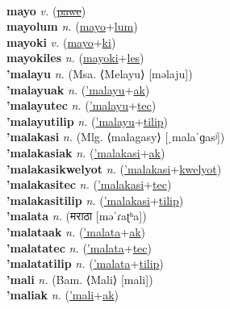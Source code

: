  \label{maipaltolum} \\
\textbf{mayo} \textit{v.} (\hyperref[pawe]{\sout{pawe}})
 \label{mayo} \\
\textbf{mayolum} \textit{n.} (\hyperref[mayo]{mayo}+\hyperref[lum]{lum})
 \label{mayolum} \\
\textbf{mayoki} \textit{v.} (\hyperref[mayo]{mayo}+\hyperref[ki]{ki})
 \label{mayoki} \\
\textbf{mayokiles} \textit{n.} (\hyperref[mayoki]{mayoki}+\hyperref[les]{les})
 \label{mayokiles} \\
\textbf{'malayu} \textit{n.} (Msa. ⟨Melayu⟩ [məlaju])
 \label{'malayu} \\
\textbf{'malayuak} \textit{n.} (\hyperref['malayu]{'malayu}+\hyperref[ak]{ak})
 \label{'malayuak} \\
\textbf{'malayutec} \textit{n.} (\hyperref['malayu]{'malayu}+\hyperref[tec]{tec})
 \label{'malayutec} \\
\textbf{'malayutilip} \textit{n.} (\hyperref['malayu]{'malayu}+\hyperref[tilip]{tilip})
 \label{'malayutilip} \\
\textbf{'malakasi} \textit{n.} (Mlg. ⟨malagasy⟩ [ˌmalaˈɡasʲ])
 \label{'malakasi} \\
\textbf{'malakasiak} \textit{n.} (\hyperref['malakasi]{'malakasi}+\hyperref[ak]{ak})
 \label{'malakasiak} \\
\textbf{'malakasikwelyot} \textit{n.} (\hyperref['malakasi]{'malakasi}+\hyperref[kwelyot]{kwelyot})
 \label{'malakasikwelyot} \\
\textbf{'malakasitec} \textit{n.} (\hyperref['malakasi]{'malakasi}+\hyperref[tec]{tec})
 \label{'malakasitec} \\
\textbf{'malakasitilip} \textit{n.} (\hyperref['malakasi]{'malakasi}+\hyperref[tilip]{tilip})
 \label{'malakasitilip} \\
\textbf{'malata} \textit{n.} ({\devanagari{}मराठा} [məˈɾaʈʰa])
 \label{'malata} \\
\textbf{'malataak} \textit{n.} (\hyperref['malata]{'malata}+\hyperref[ak]{ak})
 \label{'malataak} \\
\textbf{'malatatec} \textit{n.} (\hyperref['malata]{'malata}+\hyperref[tec]{tec})
 \label{'malatatec} \\
\textbf{'malatatilip} \textit{n.} (\hyperref['malata]{'malata}+\hyperref[tilip]{tilip})
 \label{'malatatilip} \\
\textbf{'mali} \textit{n.} (Bam. ⟨Mali⟩ [mali])
 \label{'mali} \\
\textbf{'maliak} \textit{n.} (\hyperref['mali]{'mali}+\hyperref[ak]{ak})
